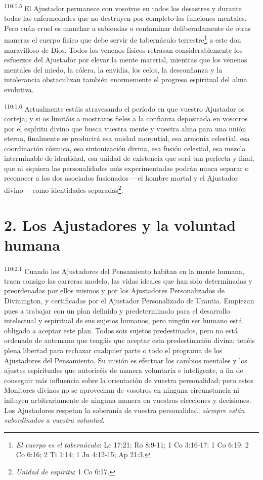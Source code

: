 \par
\textsuperscript{110:1.5} El Ajustador permanece con vosotros en todos los desastres y durante todas las enfermedades que no destruyen por completo las funciones mentales. Pero cuán cruel es manchar a sabiendas o contaminar deliberadamente de otras maneras el cuerpo físico que debe servir de tabernáculo terrestre\footnote{\textit{El cuerpo es el tabernáculo}: Lc 17:21; Ro 8:9-11; 1 Co 3:16-17; 1 Co 6:19; 2 Co 6:16; 2 Ti 1:14; 1 Jn 4:12-15; Ap 21:3.} a este don maravilloso de Dios. Todos los venenos físicos retrasan considerablemente los esfuerzos del Ajustador por elevar la mente material, mientras que los venenos mentales del miedo, la cólera, la envidia, los celos, la desconfianza y la intolerancia obstaculizan también enormemente el progreso espiritual del alma evolutiva.

\par
\textsuperscript{110:1.6} Actualmente estáis atravesando el período en que vuestro Ajustador os corteja; y si os limitáis a mostraros fieles a la confianza depositada en vosotros por el espíritu divino que busca vuestra mente y vuestra alma para una unión eterna, finalmente se producirá esa unidad morontial, esa armonía celestial, esa coordinación cósmica, esa sintonización divina, esa fusión celestial, esa mezcla interminable de identidad, esa unidad de existencia que será tan perfecta y final, que ni siquiera las personalidades más experimentadas podrán nunca separar o reconocer a los dos asociados fusionados ---el hombre mortal y el Ajustador divino--- como identidades separadas\footnote{\textit{Unidad de espíritu}: 1 Co 6:17.}.

\section*{2. Los Ajustadores y la voluntad humana}
\par
\textsuperscript{110:2.1} Cuando los Ajustadores del Pensamiento habitan en la mente humana, traen consigo las carreras modelo, las vidas ideales que han sido determinadas y preordenadas por ellos mismos y por los Ajustadores Personalizados de Divinington, y certificadas por el Ajustador Personalizado de Urantia. Empiezan pues a trabajar con un plan definido y predeterminado para el desarrollo intelectual y espiritual de sus sujetos humanos, pero ningún ser humano está obligado a aceptar este plan. Todos sois sujetos predestinados, pero no está ordenado de antemano que tengáis que aceptar esta predestinación divina; tenéis plena libertad para rechazar cualquier parte o todo el programa de los Ajustadores del Pensamiento. Su misión es efectuar los cambios mentales y los ajustes espirituales que autoricéis de manera voluntaria e inteligente, a fin de conseguir más influencia sobre la orientación de vuestra personalidad; pero estos Monitores divinos no se aprovechan de vosotros en ninguna circunstancia ni influyen arbitrariamente de ninguna manera en vuestras elecciones y decisiones. Los Ajustadores respetan la soberanía de vuestra personalidad; \textit{siempre están subordinados a vuestra voluntad}.

